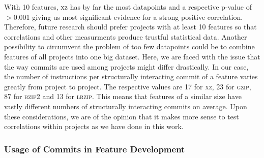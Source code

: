 With 10 features, \textsc{xz} has by far the most datapoints and a respective p-value of $>$0.001 giving us most significant evidence for a strong positive correlation. 
Therefore, future research should prefer projects with at least 10 features so that correlations and other measurments produce trustful statistical data. 
Another possibility to circumvent the problem of too few datapoints could be to combine features of all projects into one big dataset.
Here, we are faced with the issue that the way commits are used among projects might differ drastically. 
In our case, the number of instructions per structurally interacting commit of a feature varies greatly from project to project.
The respective values are 17 for \textsc{xz}, 23 for \textsc{gzip}, 87 for \textsc{bzip2} and 13 for \textsc{lrzip}.
This means that features of a similar size have vastly different numbers of structurally interacting commits on average.
Upon these considerations, we are of the opinion that it makes more sense to test correlations within projects as we have done in this work.

\subsubsection*{Usage of Commits in Feature Development}\label{sec:eval_commit_usage}

